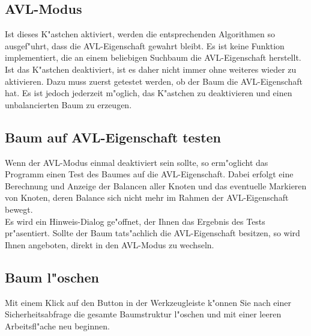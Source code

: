 \subsection{AVL-Modus}
Ist dieses K"astchen aktiviert, werden die entsprechenden Algorithmen so ausgef"uhrt, dass die AVL-Eigenschaft gewahrt
bleibt. Es ist keine Funktion implementiert, die an einem beliebigen Suchbaum die AVL-Eigenschaft herstellt. 
Ist das K"astchen deaktiviert, ist es daher nicht immer ohne weiteres wieder zu aktivieren. Dazu muss zuerst getestet werden, 
ob der Baum die AVL-Eigenschaft hat. Es ist jedoch jederzeit m"oglich, das K"astchen zu deaktivieren und einen 
unbalancierten Baum zu erzeugen. \\


\subsection{Baum auf AVL-Eigenschaft testen}
Wenn der AVL-Modus einmal deaktiviert sein sollte, so erm"oglicht das Programm einen Test des Baumes auf die AVL-Eigenschaft. 
Dabei erfolgt eine Berechnung und Anzeige der Balancen aller Knoten und das eventuelle Markieren von Knoten, deren Balance 
sich nicht mehr im Rahmen der AVL-Eigenschaft bewegt. \\
Es wird ein Hinweis-Dialog ge"offnet, der Ihnen das Ergebnis des Tests pr"asentiert. Sollte der Baum tats"achlich die 
AVL-Eigenschaft besitzen, so wird Ihnen angeboten, direkt in den AVL-Modus zu wechseln.

\bigskip
{}


\subsection{Baum l"oschen}

Mit einem Klick auf den Button  in der Werkzeugleiste k"onnen Sie 
nach einer Sicherheitsabfrage die gesamte Baumstruktur l"oschen und mit einer leeren Arbeitsfl"ache neu beginnen.

\bigskip
{}

